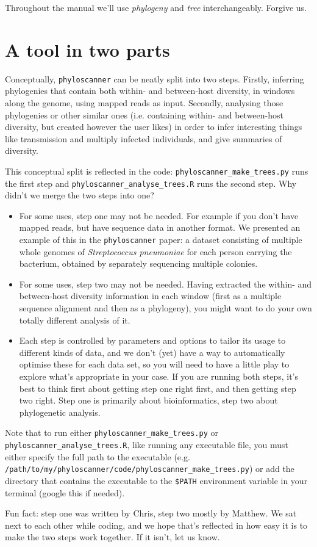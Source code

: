 \documentclass{article}
\newcommand{\p}{\texttt{phyloscanner}\xspace}
\newcommand{\pmt}{\texttt{phyloscanner\_make\_trees.py}\xspace}
\newcommand{\pat}{\texttt{phyloscanner\_analyse\_trees.R}\xspace}
\let\c\texttt
\begin{document}
Throughout the manual we'll use {\it phylogeny} and {\it tree} interchangeably.
Forgive us.

\newpage
\tableofcontents
\newpage

\section*{A tool in two parts}
Conceptually, \p can be neatly split into two steps.
Firstly, inferring phylogenies that contain both within- and between-host diversity, in windows along the genome, using mapped reads as input.
Secondly, analysing those phylogenies or other similar ones (i.e. containing within- and between-host diversity, but created however the user likes) in order to infer interesting things like transmission and multiply infected individuals, and give summaries of diversity.

This conceptual split is reflected in the code: \pmt runs the first step and \pat runs the second step.
Why didn't we merge the two steps into one?
\begin{itemize}
\item For some uses, step one may not be needed.
For example if you don't have mapped reads, but have sequence data in another format.
We presented an example of this in the \p paper: a dataset consisting of multiple whole genomes of {\it Streptococcus pneumoniae} for each person carrying the bacterium, obtained by separately sequencing multiple colonies.
\item For some uses, step two may not be needed.
Having extracted the within- and between-host diversity information in each window (first as a multiple sequence alignment and then as a phylogeny), you might want to do your own totally different analysis of it.
\item Each step is controlled by parameters and options to tailor its usage to different kinds of data, and we don't (yet) have a way to automatically optimise these for each data set, so you will need to have a little play to explore what's appropriate in your case.
If you are running both steps, it's best to think first about getting step one right first, and then getting step two right.
Step one is primarily about bioinformatics, step two about phylogenetic analysis.
\end{itemize}

Note that to run either \pmt or \pat, like running any executable file, you must either specify the full path to the executable (e.g.\\\c{/path/to/my/phyloscanner/code/}\pmt) or add the directory that contains the executable to the \c{\$PATH} environment variable in your terminal (google this if needed).

Fun fact: step one was written by Chris, step two mostly by Matthew.
We sat next to each other while coding, and we hope that's reflected in how easy it is to make the two steps work together.
If it isn't, let us know.




\end{document}
